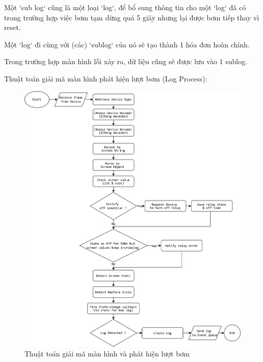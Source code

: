 Một `sub log` cũng là một loại `log`, để bổ sung thông tin cho một `log` đã có trong trường hợp việc bơm tạm dừng quá 5 giây nhưng lại được bơm tiếp thay vì reset.

Một `log` đi cùng với (các) `sublog` của nó sẽ tạo thành 1 hóa đơn hoàn chỉnh.

Trong trường hợp màn hình lỗi xảy ra, dữ liệu cũng sẽ được lưu vào 1 sublog. 

Thuật toán giải mã màn hình phát hiện lượt bơm (Log Process): 

\begin{figure}[!ht]
     \centering
    \includegraphics[width=1\linewidth]{Figures/flowcharts-Log-Process.png}
    \caption{Thuật toán giải mã màn hình và phát hiện lượt bơm}
    \label{fig:Thuật toán cho Log Process}
\end{figure}
\FloatBarrier



